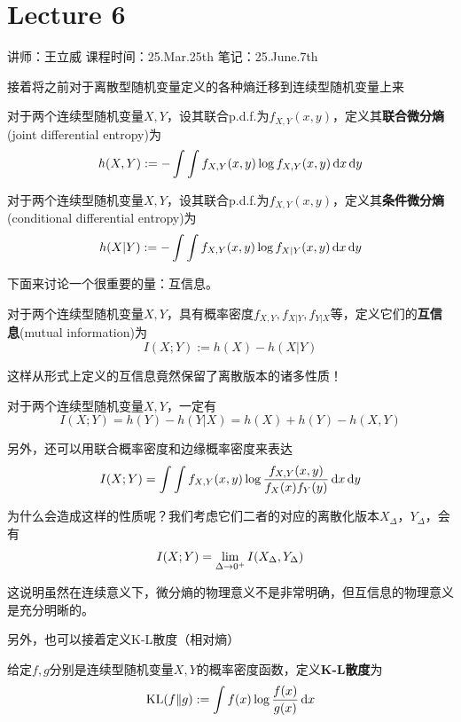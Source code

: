 \chapter{Lecture 6}

\begin{center}
    讲师：王立威 \qquad
    课程时间：25.Mar.25th \qquad 
    笔记：25.June.7th
\end{center}

\bigskip

接着将之前对于离散型随机变量定义的各种熵迁移到连续型随机变量上来 
\begin{definition}[联合微分熵]
    对于两个连续型随机变量$X,Y$，设其联合p.d.f.为$f_{X,Y}(x,y)$，定义其\textbf{联合微分熵}(joint differential entropy)为 
    \[
    h(X, Y) := - \int\int f_{X,Y}(x, y) \log f_{X,Y}(x, y) \dx\dx[y]
    \]
\end{definition}
\begin{definition}[条件微分熵]
    对于两个连续型随机变量$X,Y$，设其联合p.d.f.为$f_{X,Y}(x,y)$，定义其\textbf{条件微分熵}(conditional differential entropy)为 
    \[
    h(X| Y) := - \int\int f_{X,Y}(x, y) \log f_{X|Y}(x, y) \dx\dx[y]
    \]
\end{definition}

下面来讨论一个很重要的量：互信息。 
\begin{definition}[连续型随机变量的互信息]
    对于两个连续型随机变量$X, Y$，具有概率密度$f_{X,Y}, f_{X|Y}, f_{Y|X}$等，定义它们的\textbf{互信息}(mutual information)为 
    \[
    I(X; Y):= h(X) - h(X|Y)
    \]
\end{definition}

这样从形式上定义的互信息竟然保留了离散版本的诸多性质！
\begin{theorem}
    对于两个连续型随机变量$X, Y$，一定有
    \[
    I(X;Y) = h(Y) - h(Y|X) = h(X) + h(Y) - h(X, Y)
    \]

    另外，还可以用联合概率密度和边缘概率密度来表达
    \[
    I(X; Y) = \int\int f_{X,Y}(x, y) \log \dfrac{f_{X,Y}(x,y)}{f_X(x) f_Y(y)} \dx\dx[y]
    \]
\end{theorem}

为什么会造成这样的性质呢？我们考虑它们二者的对应的离散化版本$X_\Delta， Y_\Delta$，会有 
\[
I(X; Y) = \lim_{\Delta\ra 0^+} I(X_\Delta, Y_\Delta)
\]

这说明虽然在连续意义下，微分熵的物理意义不是非常明确，但互信息的物理意义是充分明晰的。

另外，也可以接着定义K-L散度（相对熵）
\begin{definition}
    给定$f,g$分别是连续型随机变量$X,Y$的概率密度函数，定义\textbf{K-L散度}为 
    \[
    \text{KL}(f\| g) := \int f(x) \log \dfrac{f(x)}{g(x)} \dx
    \]
\end{definition}

